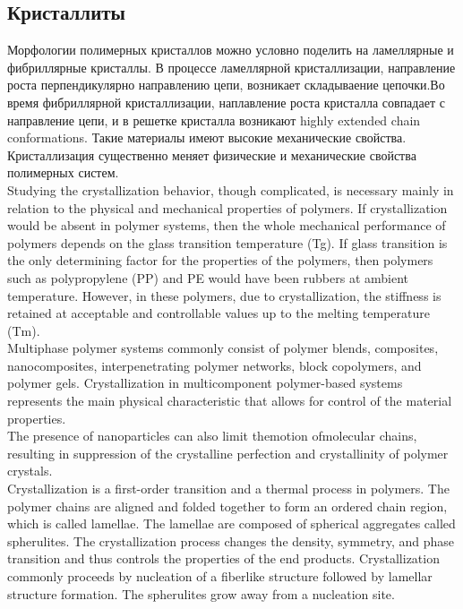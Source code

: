 \subsection{Кристаллиты}
Морфологии полимерных кристаллов можно условно поделить на ламеллярные и фибриллярные кристаллы. В процессе ламеллярной кристаллизации, направление роста перпендикулярно направлению цепи, возникает складываение цепочки.Во время фибриллярной кристаллизации, наплавление роста кристалла совпадает с направление цепи, и в решетке кристалла возникают highly extended chain conformations. Такие материалы имеют высокие механические свойства. Кристаллизация существенно меняет физические и механические свойства полимерных систем. \\

Studying the crystallization
behavior, though complicated, is necessary mainly in relation to the physical and
mechanical properties of polymers. If crystallization would be absent in polymer
systems, then the whole mechanical performance of polymers depends on the glass
transition temperature (Tg). If glass transition is the only determining factor for the
properties of the polymers, then polymers such as polypropylene (PP) and PE
would have been rubbers at ambient temperature. However, in these polymers,
due to crystallization, the stiffness is retained at acceptable and controllable values
up to the melting temperature (Tm).\\
Multiphase polymer systems commonly consist of polymer blends, composites,
nanocomposites, interpenetrating polymer networks, block copolymers, and polymer
gels. Crystallization in multicomponent polymer-based systems represents the main
physical characteristic that allows for control of the material properties.\\
The presence of nanoparticles
can also limit themotion ofmolecular chains, resulting in suppression of the crystalline
perfection and crystallinity of polymer crystals.\\
Crystallization is a first-order transition and a thermal process in polymers. The
polymer chains are aligned and folded together to form an ordered chain region,
which is called lamellae. The lamellae are composed of spherical aggregates called
spherulites. The crystallization process changes the density, symmetry, and phase
transition and thus controls the properties of the end products. Crystallization
commonly proceeds by nucleation of a fiberlike structure followed by lamellar
structure formation. The spherulites grow away from a nucleation site.\\
